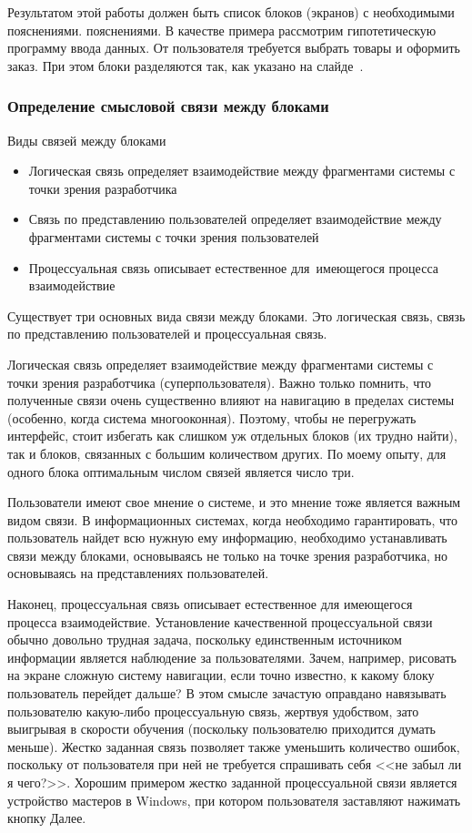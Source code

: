 \documentclass{../industrial-development}
\begin{document}
Результатом этой работы должен быть список блоков (экранов) с необходимыми пояснениями. пояснениями. В качестве примера рассмотрим гипотетическую программу ввода данных. От пользователя требуется выбрать товары и оформить заказ. При этом блоки разделяются так, как указано на слайде~\cite[с.~117--118]{Golovach}.

\begin{frame} \frametitle{Определение смысловой связи между блоками}

 \begin{block}{Виды связей между блоками}
  \begin{itemize}
   \item Логическая связь определяет взаимодействие между фрагментами системы с точки зрения разработчика
   \item Связь по представлению пользователей определяет взаимодействие между фрагментами системы с точки зрения пользователей
   \item Процессуальная связь описывает естественное для~имеющегося процесса взаимодействие
  \end{itemize}
 \end{block}
\end{frame}

\lecturenotes

Существует три основных вида связи между блоками. Это логическая связь, связь по представлению пользователей и процессуальная связь.

Логическая связь определяет взаимодействие между фрагментами системы с точки зрения разработчика (суперпользователя). Важно только помнить, что полученные связи очень существенно влияют на навигацию в пределах системы (особенно, когда система многооконная). Поэтому, чтобы не перегружать интерфейс, стоит избегать как слишком уж отдельных блоков (их трудно найти), так и блоков, связанных с большим количеством других. По моему опыту, для одного блока оптимальным числом связей является число три.

Пользователи имеют свое мнение о системе, и это мнение тоже является важным видом связи. В информационных системах, когда необходимо гарантировать, что пользователь найдет всю нужную ему информацию, необходимо устанавливать связи между блоками, основываясь не только на точке зрения разработчика, но основываясь на представлениях пользователей. 

Наконец, процессуальная связь описывает естественное для имеющегося процесса взаимодействие. Установление качественной процессуальной связи обычно довольно трудная задача, поскольку единственным источником информации является наблюдение за пользователями. Зачем, например, рисовать на экране сложную систему навигации, если точно известно, к какому блоку пользователь перейдет дальше? В этом смысле зачастую оправдано навязывать пользователю какую-либо процессуальную связь, жертвуя удобством, зато выигрывая в скорости обучения (поскольку пользователю приходится думать меньше). Жестко заданная связь позволяет также уменьшить количество ошибок, поскольку от пользователя при ней не требуется спрашивать себя <<не забыл ли я чего?>>. Хорошим примером жестко заданной процессуальной связи является устройство мастеров в Windows, при котором пользователя заставляют нажимать кнопку Далее.
\end{document}
